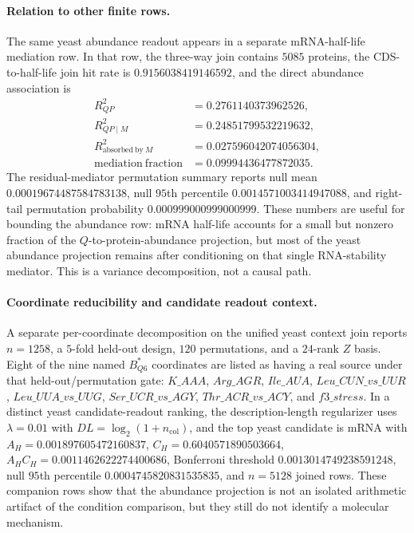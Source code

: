 \paragraph{Relation to other finite rows.}
The same yeast abundance readout appears in a separate mRNA-half-life mediation row.  In that row, the three-way join contains $5085$ proteins, the CDS-to-half-life join hit rate is $0.9156038419146592$, and the direct abundance association is
$$
\begin{aligned}
R^2_{QP} &= 0.2761140373962526,\\
R^2_{QP\mid M} &= 0.24851799532219632,\\
R^2_{\mathrm{absorbed\ by}\ M} &= 0.027596042074056304,\\
\mathrm{mediation\ fraction} &= 0.09994436477872035.
\end{aligned}
$$
The residual-mediator permutation summary reports null mean $0.00019674487584783138$, null $95$th percentile $0.0014571003414947088$, and right-tail permutation probability $0.000999000999000999$.  These numbers are useful for bounding the abundance row: mRNA half-life accounts for a small but nonzero fraction of the $Q$-to-protein-abundance projection, but most of the yeast abundance projection remains after conditioning on that single RNA-stability mediator.  This is a variance decomposition, not a causal path.

\paragraph{Coordinate reducibility and candidate readout context.}
A separate per-coordinate decomposition on the unified yeast context join reports $n=1258$, a $5$-fold held-out design, $120$ permutations, and a $24$-rank $Z$ basis.  Eight of the nine named $B^{\ast}_{Q6}$ coordinates are listed as having a real source under that held-out/permutation gate: $K\_AAA$, $Arg\_AGR$, $Ile\_AUA$, $Leu\_CUN\_vs\_UUR$, $Leu\_UUA\_vs\_UUG$, $Ser\_UCR\_vs\_AGY$, $Thr\_ACR\_vs\_ACY$, and $f3\_stress$.  In a distinct yeast candidate-readout ranking, the description-length regularizer uses $\lambda=0.01$ with $DL=\log_2(1+n_{\mathrm{col}})$, and the top yeast candidate is $\mathrm{mRNA}$ with $A_H=0.001897605472160837$, $C_H=0.6040571890503664$, $A_H C_H=0.0011462622274400686$, Bonferroni threshold $0.0013014749238591248$, null $95$th percentile $0.0004745820831535835$, and $n=5128$ joined rows.  These companion rows show that the abundance projection is not an isolated arithmetic artifact of the condition comparison, but they still do not identify a molecular mechanism.

